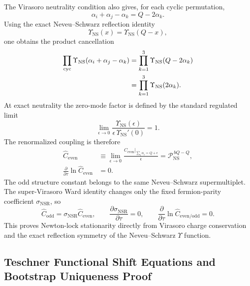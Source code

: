 \documentclass[11pt,letterpaper]{article}
\theoremstyle{plain}
\begin{document}
The Virasoro neutrality condition also gives, for each cyclic permutation,
\begin{equation}
\label{eq:appendix-c-cyclic-charge-identity}
 \alpha_i+\alpha_j-\alpha_k
 =
 Q-2\alpha_k.
\end{equation}
Using the exact Neveu--Schwarz reflection identity
\begin{equation}
\label{eq:appendix-c-upsilon-reflection}
 \Upsilon_{\text{NS}}(x)
 =
 \Upsilon_{\text{NS}}(Q-x),
\end{equation}
one obtains the product cancellation
\begin{align}
\label{eq:appendix-c-upsilon-product-cancellation}
 \prod_{\mathrm{cyc}}
 \Upsilon_{\text{NS}}(\alpha_i+\alpha_j-\alpha_k)
 &=
 \prod_{k=1}^{3}
 \Upsilon_{\text{NS}}(Q-2\alpha_k)
 \notag\\
 &=
 \prod_{k=1}^{3}
 \Upsilon_{\text{NS}}(2\alpha_k).
\end{align}
At exact neutrality the zero-mode factor is defined by the standard regulated
limit
\begin{equation}
\label{eq:appendix-c-neutral-regulator}
 \lim_{\epsilon\rightarrow0}
 \frac{\Upsilon_{\text{NS}}(\epsilon)}
 {\epsilon\,\Upsilon_{\text{NS}}'(0)}
 =
 1.
\end{equation}
The renormalized coupling is therefore
\begin{align}
\label{eq:appendix-c-renormalized-even-coupling}
 \widehat C_{\text{even}}
 &\equiv
 \lim_{\epsilon\rightarrow0}
 \frac{
 C_{\text{even}}
 \big|_{\sum_i\alpha_i=Q+\epsilon}
 }{\epsilon}
 =
 \mathcal P_{\text{NS}}^{\,bQ-Q},
 \\
\label{eq:appendix-c-even-stationarity}
 \frac{\partial}{\partial\tau}
 \ln\widehat C_{\text{even}}
 &=
 0.
\end{align}
The odd structure constant belongs to the same Neveu--Schwarz supermultiplet.
The super-Virasoro Ward identity changes only the fixed fermion-parity
coefficient $\sigma_{\text{NSR}}$, so
\begin{equation}
\label{eq:appendix-c-odd-stationarity}
 \widehat C_{\text{odd}}
 =
 \sigma_{\text{NSR}}\widehat C_{\text{even}},
 \qquad
 \frac{\partial\sigma_{\text{NSR}}}{\partial\tau}=0,
 \qquad
 \boxed{
 \frac{\partial}{\partial\tau}
 \ln\widehat C_{\text{even/odd}}
 =
 0.}
\end{equation}
This proves Newton-lock stationarity directly from Virasoro charge
conservation and the exact reflection symmetry of the Neveu--Schwarz
$\Upsilon$ function.

\subsection{Teschner Functional Shift Equations and Bootstrap Uniqueness Proof}
\label{app:teschner-shift-equations-proof}
\end{document}
